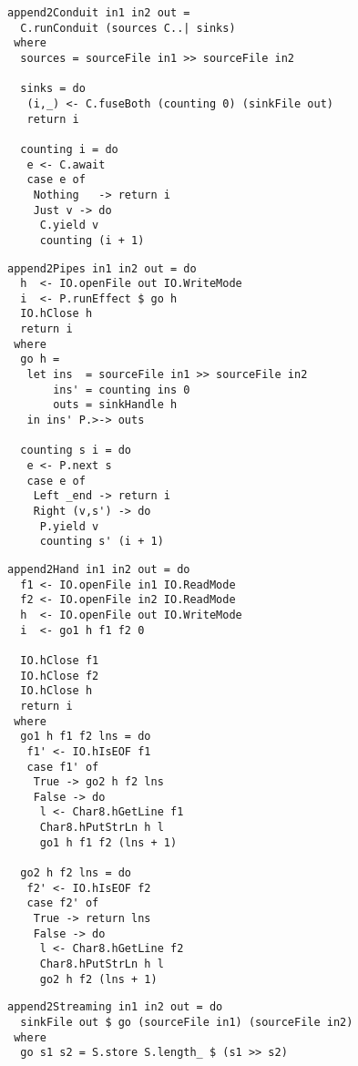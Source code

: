 \begin{lstlisting}[float=ht,label=l:a:bench:append2Conduit,caption=Conduit implementation of \Hs/append2/]
append2Conduit in1 in2 out =
  C.runConduit (sources C..| sinks)
 where
  sources = sourceFile in1 >> sourceFile in2

  sinks = do
   (i,_) <- C.fuseBoth (counting 0) (sinkFile out)
   return i

  counting i = do
   e <- C.await
   case e of
    Nothing   -> return i
    Just v -> do
     C.yield v
     counting (i + 1)
\end{lstlisting}

\begin{lstlisting}[float=ht,label=l:a:bench:append2Pipes,caption=Pipes implementation of \Hs/append2/]
append2Pipes in1 in2 out = do
  h  <- IO.openFile out IO.WriteMode
  i  <- P.runEffect $ go h
  IO.hClose h
  return i
 where
  go h =
   let ins  = sourceFile in1 >> sourceFile in2
       ins' = counting ins 0
       outs = sinkHandle h
   in ins' P.>-> outs 

  counting s i = do
   e <- P.next s
   case e of
    Left _end -> return i
    Right (v,s') -> do
     P.yield v
     counting s' (i + 1)
\end{lstlisting}

\begin{lstlisting}[float=ht,label=l:a:bench:append2Hand,caption=Hand-fused implementation of \Hs/append2/]
append2Hand in1 in2 out = do
  f1 <- IO.openFile in1 IO.ReadMode
  f2 <- IO.openFile in2 IO.ReadMode
  h  <- IO.openFile out IO.WriteMode
  i  <- go1 h f1 f2 0

  IO.hClose f1
  IO.hClose f2
  IO.hClose h
  return i
 where
  go1 h f1 f2 lns = do
   f1' <- IO.hIsEOF f1
   case f1' of
    True -> go2 h f2 lns
    False -> do
     l <- Char8.hGetLine f1
     Char8.hPutStrLn h l
     go1 h f1 f2 (lns + 1)

  go2 h f2 lns = do
   f2' <- IO.hIsEOF f2
   case f2' of
    True -> return lns
    False -> do
     l <- Char8.hGetLine f2
     Char8.hPutStrLn h l
     go2 h f2 (lns + 1)
\end{lstlisting}

\begin{lstlisting}[float=ht,label=l:a:bench:append2Streaming,caption=Streaming implementation of \Hs/append2/]
append2Streaming in1 in2 out = do
  sinkFile out $ go (sourceFile in1) (sourceFile in2)
 where
  go s1 s2 = S.store S.length_ $ (s1 >> s2)
\end{lstlisting}

